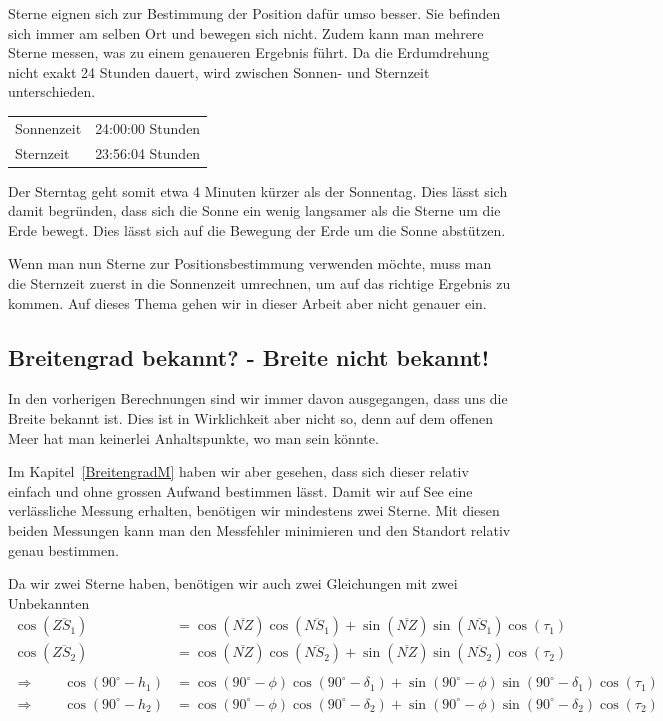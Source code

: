 \begin{refsection}
Sterne eignen sich zur Bestimmung der Position dafür umso besser. Sie befinden sich immer am selben Ort und bewegen sich nicht. Zudem kann man mehrere Sterne messen, was zu einem genaueren Ergebnis führt. Da die Erdumdrehung nicht exakt 24 Stunden dauert, wird zwischen Sonnen- und Sternzeit unterschieden.

\begin{center}
\begin{tabular}{ll}
Sonnenzeit & 24:00:00 Stunden \\
Sternzeit & 23:56:04 Stunden
\end{tabular}
\end{center}

Der Sterntag geht somit etwa 4 Minuten kürzer als der Sonnentag. Dies lässt sich damit begründen, dass sich die Sonne ein wenig langsamer als die Sterne um die Erde bewegt. Dies lässt sich auf die Bewegung der Erde um die Sonne abstützen.

Wenn man nun Sterne zur Positionsbestimmung verwenden möchte, muss man die Sternzeit zuerst in die Sonnenzeit umrechnen, um auf das richtige Ergebnis zu kommen. Auf dieses Thema gehen wir in dieser Arbeit aber nicht genauer ein.


\subsection{Breitengrad bekannt? - Breite nicht bekannt!}

In den vorherigen Berechnungen sind wir immer davon ausgegangen, dass uns die Breite bekannt ist. Dies ist in Wirklichkeit aber nicht so, denn auf dem offenen Meer hat man keinerlei Anhaltspunkte, wo man sein könnte.

Im Kapitel~\ref{BreitengradM}  haben wir aber gesehen, dass sich dieser relativ einfach und ohne grossen Aufwand bestimmen lässt. Damit wir auf See eine verlässliche Messung erhalten, benötigen wir mindestens zwei Sterne. Mit diesen beiden Messungen kann man den Messfehler minimieren und den Standort relativ genau bestimmen.

Da wir zwei Sterne haben, benötigen wir auch zwei Gleichungen mit zwei Unbekannten
\begin{align*}
\cos(\overline{ZS_1}) &= \cos(\overline{NZ}) \cos(\overline{NS_1}) + \sin(\overline{NZ}) \sin(\overline{NS_1}) \cos(\tau_1) \\
\cos(\overline{ZS_2}) &= \cos(\overline{NZ}) \cos(\overline{NS_2}) + \sin(\overline{NZ}) \sin(\overline{NS_2}) \cos(\tau_2) \\
\\
\Rightarrow \quad \quad
\cos(90^{\circ} - h_1) &= \cos(90^{\circ} - \phi) \cos(90^{\circ} - \delta_1) + \sin(90^{\circ} - \phi)\sin(90^{\circ} - \delta_1) \cos(\tau_1) \\
\Rightarrow \quad \quad
\cos(90^{\circ} - h_2) &= \cos(90^{\circ} - \phi) \cos(90^{\circ} - \delta_2) + \sin(90^{\circ} - \phi)\sin(90^{\circ} - \delta_2) \cos(\tau_2)
\end{align*}


\end{refsection}
